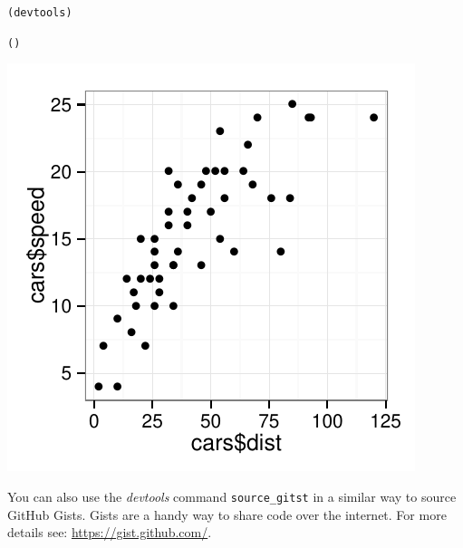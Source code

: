 \begin{knitrout}
\color{fgcolor}\begin{kframe}
\begin{alltt}
(devtools)

()
\end{alltt}
\end{kframe}

{\centering \includegraphics[width=\maxwidth]{figure/Ch8SourceURLExample} 

}


\end{knitrout}


\noindent You can also use the {\emph{devtools}} command \texttt{source\_gitst} in a similar way to source GitHub Gists. Gists are a handy way to share code over the internet. For more details see: \url{https://gist.github.com/}.

